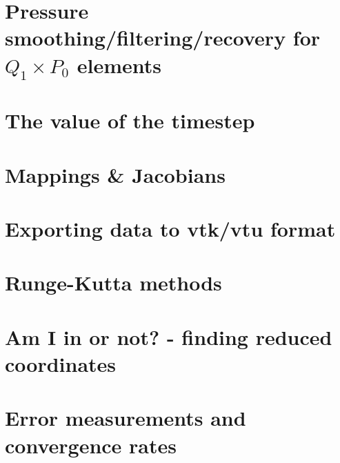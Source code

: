 \section{Pressure smoothing/filtering/recovery for $Q_1\times P_0$ elements \label{psmoothing}} 
\newpage %
\newpage %
\section{The value of the timestep}\label{ss:cfl}  %
\newpage %
\section{Mappings \& Jacobians \label{ss:mappings}}  %
\newpage %
\section{Exporting data to vtk/vtu format}  %
\newpage %
\section{Runge-Kutta methods}\label{ss:rkm}  %
\newpage %
\section{Am I in or not? - finding reduced coordinates}\label{sec:amiin} %
\newpage %
\section{Error measurements and convergence rates}  %
\newpage %
